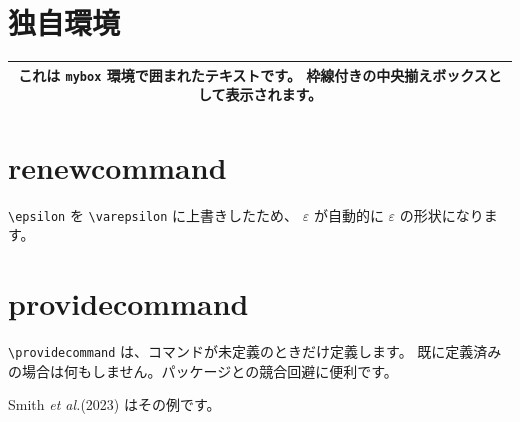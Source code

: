 \documentclass[lualatex,ja=standard]{bxjsarticle}
\newenvironment{mybox}
  {\begin{center}
   \begin{tabular}{|c|}
   \hline
   \begin{minipage}{0.85\linewidth}\smallskip\par\noindent\ignorespaces}
  {\par\smallskip\end{minipage}\\
   \hline\end{tabular}\end{center}}
\renewcommand{\epsilon}{\varepsilon}
\begin{document}
\section{独自環境}

\begin{mybox}
  これは \texttt{mybox} 環境で囲まれたテキストです。
  枠線付きの中央揃えボックスとして表示されます。
\end{mybox}

\section{renewcommand}

\texttt{\textbackslash epsilon} を \texttt{\textbackslash varepsilon} に上書きしたため、
$\epsilon$ が自動的に \(\varepsilon\) の形状になります。

\section{providecommand}

\texttt{\textbackslash providecommand} は、コマンドが未定義のときだけ定義します。
既に定義済みの場合は何もしません。パッケージとの競合回避に便利です。

\providecommand{\etal}{\textit{et al.}}

Smith \etal (2023) はその例です。
\end{document}
